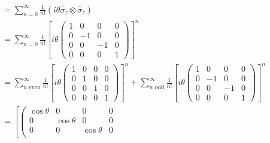 \documentclass[12pt,a4]{article}
\begin{document}
\begin{enumerate}
\begin{enumerate}
\begin{align*}
                 &= \sum_{n = 0}^\infty \frac{1}{n!}\left(i \theta \hat \sigma_z \otimes \hat \sigma_z\right)\\
                 &= \sum_{n = 0}^\infty \frac{1}{n!}
                   \left[
                      i \theta
                      \left( 
                        \begin{matrix}
                          1 & 0 & 0 & 0 \\
                          0 &-1 & 0 & 0 \\
                          0 & 0 &-1 & 0 \\
                          0 & 0 & 0 & 1
                        \end{matrix}
                      \right)
                    \right]^n\\
                  &= \sum_{n \text{ even}}^\infty \frac{1}{n!}
                   \left[
                      i \theta
                      \left( 
                        \begin{matrix}
                          1 & 0 & 0 & 0 \\
                          0 & 1 & 0 & 0 \\
                          0 & 0 & 1 & 0 \\
                          0 & 0 & 0 & 1
                        \end{matrix}
                      \right)
                    \right]^n
                  + \sum_{n \text{ odd}}^\infty \frac{1}{n!}
                   \left[
                      i \theta
                      \left( 
                        \begin{matrix}
                          1 &  0 &  0 & 0 \\
                          0 & -1 &  0 & 0 \\
                          0 &  0 & -1 & 0 \\
                          0 &  0 &  0 & 1
                        \end{matrix}
                      \right)
                    \right]^n\\
                  &= 
                   \left[
                      \left( 
                        \begin{matrix}
                          \cos \theta & 0 & 0 & 0 \\
                          0 & \cos \theta & 0 & 0 \\
                          0 & 0 & \cos \theta & 0 \\

\end{matrix}
\end{align*}
\end{enumerate}
\end{enumerate}
\end{document}
